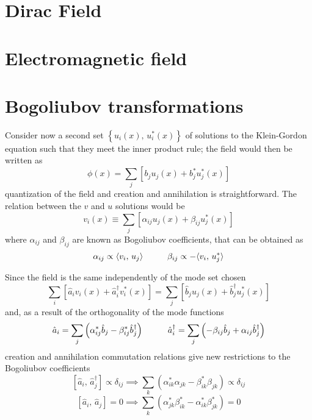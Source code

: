 \section{Dirac Field}
\section{Electromagnetic field}
\section{Bogoliubov transformations}
Consider now a second set $\left\{u_i(x),\,u_i^*(x)\right\}$ of solutions to the Klein-Gordon equation such that they meet the inner product rule; the field would then be written as
\begin{equation}
	\phi(x)=\sum_j\left[b_ju_j(x)+b_j^*u_j^*(x)\right]
\end{equation}
quantization of the field and creation and annihilation is straightforward. The relation between the $v$ and $u$ solutions would be
\begin{equation}
	v_i(x)\equiv\sum_j\left[\alpha_{ij}u_j(x)+\beta_{ij}u^*_j(x)\right]
\end{equation}
where $\alpha_{ij}$ and $\beta_{ij}$ are known as Bogoliubov coefficients, that can be obtained as
\begin{equation}
	\alpha_{ij}\propto\langle v_i,\,u_j\rangle\hspace{1.0cm}\beta_{ij}\propto -\langle v_i,\,u_j^*\rangle
\end{equation}

Since the field is the same independently of the mode set chosen
\begin{equation}
	\sum_i\left[\hat{a}_iv_i(x)+\hat{a}_i^\dagger v^*_i(x)\right]=\sum_j\left[\hat{b}_ju_j(x)+\hat{b}_j^\dagger u_j^*(x)\right]
\end{equation}
and, as a result of the orthogonality of the mode functions
\begin{equation}
	\hat{a}_i=\sum_j\left(\alpha_{ij}^*\hat{b}_j-\beta_{ij}^*\hat{b}_j^\dagger\right)\hspace{1.0cm}\hat{a}_i^\dagger=\sum_j\left(-\beta_{ij}\hat{b}_j+\alpha_{ij}\hat{b}_j^\dagger\right)
\end{equation}
creation and annihilation commutation relations give new restrictions to the Bogoliubov coefficients
\begin{equation}
	\left[\hat{a}_i,\,\hat{a}_j^\dagger\right]\propto\delta_{ij}\implies \sum_k\left(\alpha_{ik}^*\alpha_{jk}-\beta^*_{ik}\beta_{jk}\right)\propto\delta_{ij}
\end{equation}
\begin{equation}
	\left[\hat{a}_i,\,\hat{a}_j\right]=0\implies \sum_k\left(\alpha_{jk}^*\beta_{ik}^*-\alpha_{ik}^*\beta_{jk}^*\right)=0
\end{equation}

